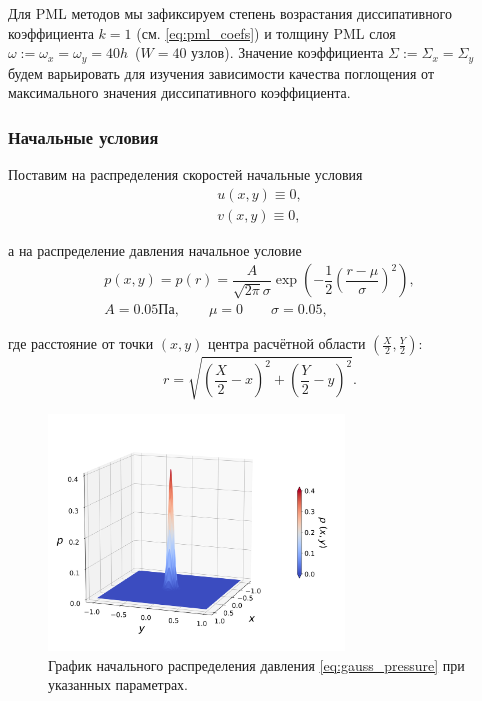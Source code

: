 Для PML методов мы зафиксируем степень возрастания диссипативного коэффициента $k=1$ (см. \eqref{eq:pml_coefs}) и толщину PML слоя $\omega := \omega_x = \omega_y = 40 h$~($W=40$ узлов). Значение коэффициента $\Sigma:=\Sigma_x = \Sigma_y$ будем варьировать для изучения зависимости качества поглощения от максимального значения диссипативного коэффициента.

\subsubsection{Начальные условия}

Поставим на распределения скоростей начальные условия
\begin{equation*}
\begin{gathered}
    u(x,y) \equiv 0 ,\\
    v(x,y) \equiv 0 ,
\end{gathered}
\end{equation*}

\noindent а на распределение давления начальное условие
\begin{equation}
\begin{gathered}
    p(x,y) = p(r) = \dfrac{A}{\sqrt{2\pi}\sigma}  \exp\left(-\dfrac{1}{2}\left(\dfrac{r - \mu}{\sigma}\right)^2\right) ,\\
    A=0.05 \text{Па} , \qquad \mu = 0 \qquad \sigma=0.05 ,
\end{gathered}
\label{eq:gauss_pressure}
\end{equation}

\noindent где расстояние от точки $(x,y)$ центра расчётной области $\left(\frac{X}{2},\frac{Y}{2}\right)$:
$$r = \sqrt{\left(\frac{X}{2} - x\right)^2+\left(\frac{Y}{2} - y\right)^2} .$$

\begin{figure}[H]
    \centering
    \includegraphics[trim={0pt 45pt 0pt 70pt},clip,width=0.7\textwidth]{images/pml/gauss_wavelet.png}
    \caption{График начального распределения давления  \eqref{eq:gauss_pressure} при указанных параметрах.}
    \label{fig:gauss_plot}
\end{figure}

